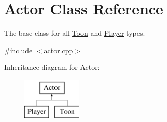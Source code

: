 \hypertarget{classActor}{}\section{Actor Class Reference}
\label{classActor}


The base class for all \mbox{\hyperlink{classToon}{Toon}} and \mbox{\hyperlink{classPlayer}{Player}} types.  




{\ttfamily \#include $<$actor.\+cpp$>$}

Inheritance diagram for Actor\+:\begin{figure}[H]
\begin{center}
\leavevmode
\includegraphics[height=2.000000cm]{classActor}
\end{center}
\end{figure}
